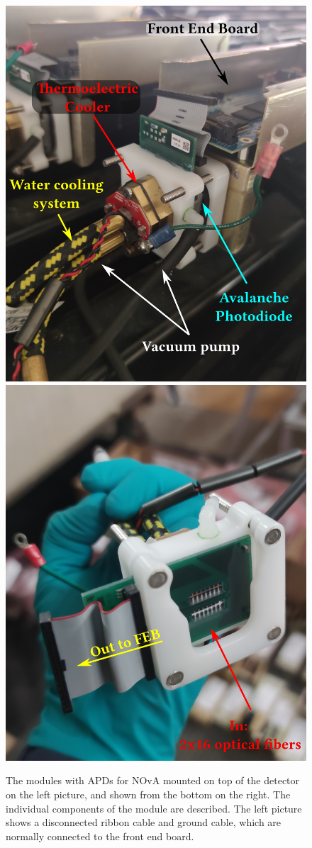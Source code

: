 

\begin{figure}[!htb]  
  \centering
  \includegraphics*[width=.495\textwidth]{Plots/NOvAExperiment/NOvAAPDMountedWithLabels.jpg}
  \noindent\centering
  \includegraphics*[width=.495\textwidth]{Plots/NOvAExperiment/NOvAAPDBottomWithLabels.jpg}
  \caption[NOvA Avalanche Photo Diods]{The modules with \acrshort{APD}s for \acrshort{NOvA} mounted on top of the detector on the left picture, and shown from the bottom on the right. The individual components of the module are described. The left picture shows a disconnected ribbon cable and ground cable, which are normally connected to the front end board.}
 \label{fig:NOvAAPD}
\end{figure}

